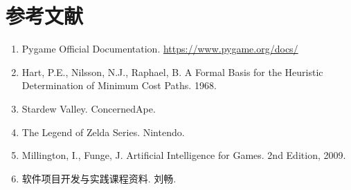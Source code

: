 \documentclass[12pt,a4paper]{article}
\begin{document}
\section*{参考文献}
\begin{enumerate}[leftmargin=2em]
    \item Pygame Official Documentation. \url{https://www.pygame.org/docs/}
    \item Hart, P.E., Nilsson, N.J., Raphael, B. A Formal Basis for the Heuristic Determination of Minimum Cost Paths. 1968.
    \item Stardew Valley. ConcernedApe.
    \item The Legend of Zelda Series. Nintendo.
    \item Millington, I., Funge, J. Artificial Intelligence for Games. 2nd Edition, 2009.
    \item 软件项目开发与实践课程资料. 刘畅.
\end{enumerate}
\end{document}
